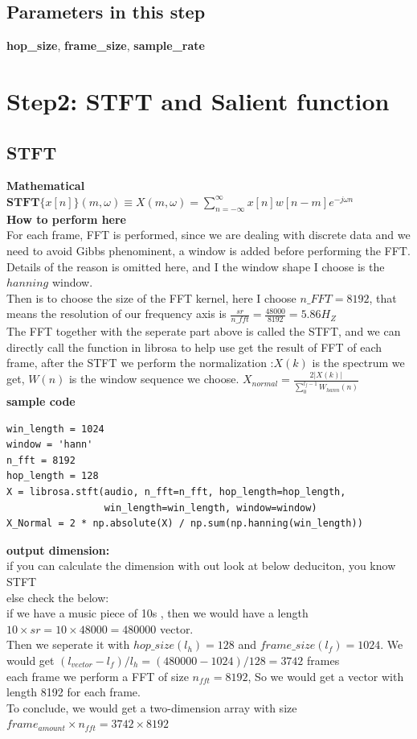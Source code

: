 \documentclass[twoside]{article}
\begin{document}
\subsection{Parameters in this step}
\textbf{hop\_size},     \textbf{frame\_size},    \textbf{sample\_rate}

\section{Step2: STFT and Salient function}
\subsection{STFT}
\textbf{Mathematical}\\
$ \mathbf {STFT} \{x[n]\}(m,\omega )\equiv X(m,\omega )=\sum _{n=-\infty }^{\infty }x[n]w[n-m]e^{-j\omega n}$\\
\textbf{How to perform here}\\
For each frame, FFT is performed, since we are dealing with discrete data and we need to avoid Gibbs phenominent, a window is added before performing the FFT. Details of the reason is omitted here, and I the window shape I choose is the $hanning$ window. \\
Then is to choose the size of the FFT kernel, here I choose $n\_FFT=8192$, that means the resolution of our frequency axis is $\frac{sr}{n\_fft} = \frac{48000}{8192} = 5.86H_Z$\\
The FFT together with the seperate part above is called the STFT, and we can directly call the function in librosa to help use get the result of FFT of each frame, after the STFT we perform the normalization :$X(k)$ is the spectrum we get, $W(n)$ is the window sequence we choose.  $X_{normal} = \frac{2|X(k)|}{\displaystyle \sum_{0}^{l_f - 1} W_{hann}(n)}$\\
\textbf{sample code}
\begin{lstlisting}
win_length = 1024
window = 'hann'
n_fft = 8192
hop_length = 128
X = librosa.stft(audio, n_fft=n_fft, hop_length=hop_length,
                 win_length=win_length, window=window)
X_Normal = 2 * np.absolute(X) / np.sum(np.hanning(win_length))
\end{lstlisting}
\textbf{output dimension:}\\
if you can calculate the dimension with out look at below deduciton, you know STFT\\
else check the below:\\
if we have a music piece of 10s , then we would have a length $10\times sr = 10 \times 48000 = 480000$ vector.\\
Then we seperate it with  $hop\_size(l_h) = 128 $ and $frame\_size(l_f) = 1024$. We would get $(l_{vector} - l_f )/l_h = (480000-1024)/128 = 3742$ frames\\
each frame we perform a FFT of size $n_{fft} = 8192$, So we would get a vector with length 8192 for each frame. \\
To conclude, we would get a two-dimension array with size $frame_{amount} \times n_{fft} = 3742 \times 8192$
\end{document}
